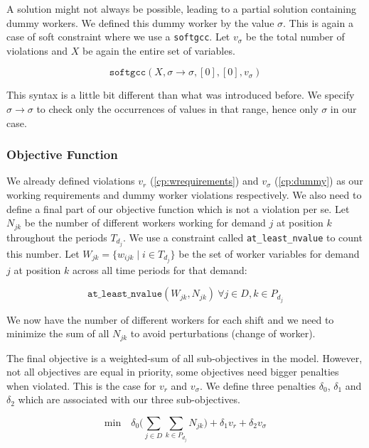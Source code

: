 \documentclass[../../thesis.tex]{subfiles}
\begin{document}
A solution might not always be possible, leading to a partial solution containing dummy workers.
We defined this dummy worker by the value $\sigma$. This is again a case of soft constraint where 
we use a \texttt{softgcc}. Let $v_{\sigma}$ be the total number of violations and $X$ be again the entire set of variables.


\begin{equation}
  \texttt{softgcc}(X, \sigma \rightarrow \sigma, [0], [0], v_{\sigma}) \label{cp:dummy}
\end{equation}

This syntax is a little bit different than what was introduced before. We specify $\sigma \rightarrow \sigma$ to check only the occurrences of values 
in that range, hence only $\sigma$ in our case.




\subsubsection{Objective Function}

We already defined violations $v_r$ (\ref{cp:wrequirements}) and $v_{\sigma}$ (\ref{cp:dummy}) as our working requirements and dummy worker violations respectively.
We also need to define a final part of our objective function which is not a violation per se. Let $N_{jk}$ be the number 
of different workers working for demand $j$ at position $k$ throughout the periods $T_{d_j}$. We use a 
constraint called \texttt{at\_least\_nvalue} \cite{nvalue} to count this number.
Let  $W_{jk} = \{ w_{ijk} \mid i \in T_{d_j} \}$ be the set of worker variables for demand $j$ at position $k$ across all time periods for that demand:

\begin{equation}
  \texttt{at\_least\_nvalue}(W_{jk}, N_{jk}) \ \forall j \in D, k \in P_{d_j}
\end{equation}

We now have the number of different workers for each shift and we need to minimize the sum of all $N_{jk}$ to avoid perturbations (change of worker).

The final objective is a weighted-sum of all sub-objectives in the model. However, not all objectives are equal 
in priority, some objectives need bigger penalties when violated. This is the case for $v_r$ and $v_{\sigma}$.
We define three penalties $\delta_0$, $\delta_1$ and $\delta_2$ which are associated with our three sub-objectives.

\begin{equation}
  \text{min} \quad \delta_0 \big( \sum_{j \in D} \sum_{k \in P_{d_j}} N_{jk} \big) + \delta_1 v_r + \delta_2 v_{\sigma} \label{cp:objective}
\end{equation}
\end{document}
